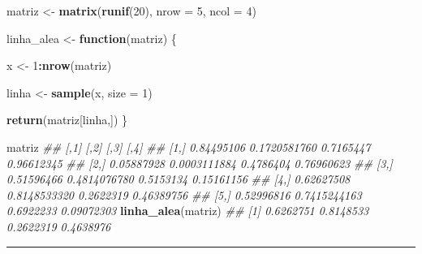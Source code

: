 \documentclass[]{book}
\newenvironment{Shaded}{\begin{snugshade}}{\end{snugshade}}
\newcommand{\CommentTok}[1]{\textcolor[rgb]{0.56,0.35,0.01}{\textit{#1}}}
\newcommand{\ControlFlowTok}[1]{\textcolor[rgb]{0.13,0.29,0.53}{\textbf{#1}}}
\newcommand{\DataTypeTok}[1]{\textcolor[rgb]{0.13,0.29,0.53}{#1}}
\newcommand{\DecValTok}[1]{\textcolor[rgb]{0.00,0.00,0.81}{#1}}
\newcommand{\KeywordTok}[1]{\textcolor[rgb]{0.13,0.29,0.53}{\textbf{#1}}}
\newcommand{\NormalTok}[1]{#1}
\newcommand{\OperatorTok}[1]{\textcolor[rgb]{0.81,0.36,0.00}{\textbf{#1}}}
\newcommand{\StringTok}[1]{\textcolor[rgb]{0.31,0.60,0.02}{#1}}
\begin{document}
\begin{Shaded}
\begin{Highlighting}[]
\NormalTok{matriz <-}\StringTok{ }\KeywordTok{matrix}\NormalTok{(}\KeywordTok{runif}\NormalTok{(}\DecValTok{20}\NormalTok{), }\DataTypeTok{nrow =} \DecValTok{5}\NormalTok{, }\DataTypeTok{ncol =} \DecValTok{4}\NormalTok{)}

\NormalTok{linha_alea <-}\StringTok{ }\ControlFlowTok{function}\NormalTok{(matriz) \{}
  
\NormalTok{  x <-}\StringTok{ }\DecValTok{1}\OperatorTok{:}\KeywordTok{nrow}\NormalTok{(matriz)}
  
\NormalTok{  linha <-}\StringTok{ }\KeywordTok{sample}\NormalTok{(x, }\DataTypeTok{size =} \DecValTok{1}\NormalTok{)}
  
  \KeywordTok{return}\NormalTok{(matriz[linha,])}
\NormalTok{\}}

\NormalTok{matriz}
\CommentTok{##            [,1]         [,2]      [,3]       [,4]}
\CommentTok{## [1,] 0.84495106 0.1720581760 0.7165447 0.96612345}
\CommentTok{## [2,] 0.05887928 0.0003111884 0.4786404 0.76960623}
\CommentTok{## [3,] 0.51596466 0.4814076780 0.5153134 0.15161156}
\CommentTok{## [4,] 0.62627508 0.8148533320 0.2622319 0.46389756}
\CommentTok{## [5,] 0.52996816 0.7415244163 0.6922233 0.09072303}
\KeywordTok{linha_alea}\NormalTok{(matriz)}
\CommentTok{## [1] 0.6262751 0.8148533 0.2622319 0.4638976}
\end{Highlighting}
\end{Shaded}

\begin{center}\rule{0.5\linewidth}{0.5pt}\end{center}
\end{document}

